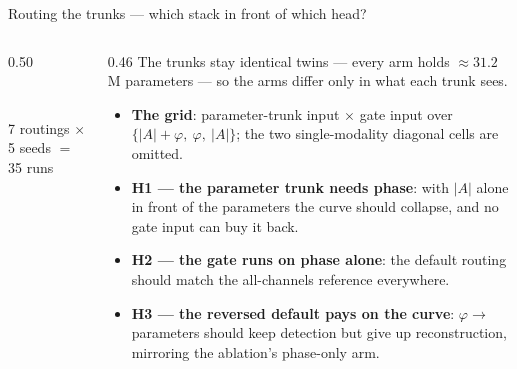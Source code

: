 \begin{frame}{Routing the trunks --- which stack in front of which head?}
\begin{columns}[c]
\begin{column}{0.50\textwidth}
      \\[5pt]
      {\scriptsize\color{soft} 7 routings $\times$ 5 seeds $=$ 35 runs\par}
    \end{column}
    \begin{column}{0.46\textwidth}
      \small
      The trunks stay identical twins --- every arm holds
      ${\approx}31.2$\,M parameters --- so the arms differ only in what each
      trunk sees.
      \par\smallskip
      \begin{itemize}\setlength{\itemsep}{5pt}
        \item \textbf{The grid}: parameter-trunk input $\times$ gate input over
              $\{|A|{+}\varphi,\ \varphi,\ |A|\}$; the two single-modality
              diagonal cells are omitted.
        \item \textbf{H1 --- the parameter trunk needs phase}: with $|A|$ alone
              in front of the parameters the curve should collapse, and no gate
              input can buy it back.
        \item \textbf{H2 --- the gate runs on phase alone}: the default routing
              should match the all-channels reference everywhere.
        \item \textbf{H3 --- the reversed default pays on the curve}:
              $\varphi\to$ parameters should keep detection but give up
              reconstruction, mirroring the ablation's phase-only arm.
      \end{itemize}
    \end{column}
  \end{columns}
\end{frame}

